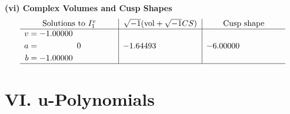 \documentclass[1p]{elsarticle_modified}
\theoremstyle{definition}
\newcommand{\I}{\sqrt{-1}}
\begin{document}
\newpage\flushleft \textbf{(vi) Complex Volumes and Cusp Shapes}
$$\begin{array}{c|c|c}  
\text{Solutions to }I^v_{1}& \I (\text{vol} + \sqrt{-1}CS) & \text{Cusp shape}\\
 \hline 
\begin{aligned}
v &= -1.00000\phantom{ +0.000000I} \\
a &= \phantom{-0.000000 } 0 \\
b &= -1.00000\phantom{ +0.000000I}\end{aligned}
 & -1.64493\phantom{ +0.000000I} & -6.00000\phantom{ +0.000000I}\\
 \hline 
 \end{array}$$\newpage
\newpage\renewcommand{\arraystretch}{1}
\centering \section*{ VI. u-Polynomials}
\end{document}
